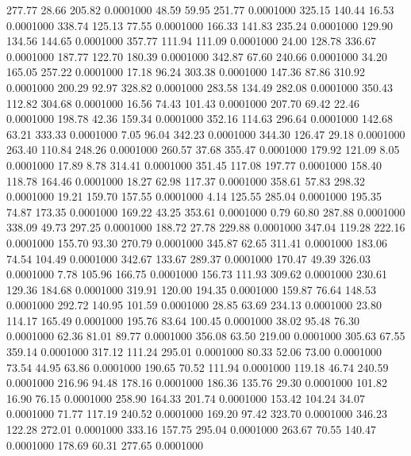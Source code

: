  277.77   28.66  205.82   0.0001000
  48.59   59.95  251.77   0.0001000
 325.15  140.44   16.53   0.0001000
 338.74  125.13   77.55   0.0001000
 166.33  141.83  235.24   0.0001000
 129.90  134.56  144.65   0.0001000
 357.77  111.94  111.09   0.0001000
  24.00  128.78  336.67   0.0001000
 187.77  122.70  180.39   0.0001000
 342.87   67.60  240.66   0.0001000
  34.20  165.05  257.22   0.0001000
  17.18   96.24  303.38   0.0001000
 147.36   87.86  310.92   0.0001000
 200.29   92.97  328.82   0.0001000
 283.58  134.49  282.08   0.0001000
 350.43  112.82  304.68   0.0001000
  16.56   74.43  101.43   0.0001000
 207.70   69.42   22.46   0.0001000
 198.78   42.36  159.34   0.0001000
 352.16  114.63  296.64   0.0001000
 142.68   63.21  333.33   0.0001000
   7.05   96.04  342.23   0.0001000
 344.30  126.47   29.18   0.0001000
 263.40  110.84  248.26   0.0001000
 260.57   37.68  355.47   0.0001000
 179.92  121.09    8.05   0.0001000
  17.89    8.78  314.41   0.0001000
 351.45  117.08  197.77   0.0001000
 158.40  118.78  164.46   0.0001000
  18.27   62.98  117.37   0.0001000
 358.61   57.83  298.32   0.0001000
  19.21  159.70  157.55   0.0001000
   4.14  125.55  285.04   0.0001000
 195.35   74.87  173.35   0.0001000
 169.22   43.25  353.61   0.0001000
   0.79   60.80  287.88   0.0001000
 338.09   49.73  297.25   0.0001000
 188.72   27.78  229.88   0.0001000
 347.04  119.28  222.16   0.0001000
 155.70   93.30  270.79   0.0001000
 345.87   62.65  311.41   0.0001000
 183.06   74.54  104.49   0.0001000
 342.67  133.67  289.37   0.0001000
 170.47   49.39  326.03   0.0001000
   7.78  105.96  166.75   0.0001000
 156.73  111.93  309.62   0.0001000
 230.61  129.36  184.68   0.0001000
 319.91  120.00  194.35   0.0001000
 159.87   76.64  148.53   0.0001000
 292.72  140.95  101.59   0.0001000
  28.85   63.69  234.13   0.0001000
  23.80  114.17  165.49   0.0001000
 195.76   83.64  100.45   0.0001000
  38.02   95.48   76.30   0.0001000
  62.36   81.01   89.77   0.0001000
 356.08   63.50  219.00   0.0001000
 305.63   67.55  359.14   0.0001000
 317.12  111.24  295.01   0.0001000
  80.33   52.06   73.00   0.0001000
  73.54   44.95   63.86   0.0001000
 190.65   70.52  111.94   0.0001000
 119.18   46.74  240.59   0.0001000
 216.96   94.48  178.16   0.0001000
 186.36  135.76   29.30   0.0001000
 101.82   16.90   76.15   0.0001000
 258.90  164.33  201.74   0.0001000
 153.42  104.24   34.07   0.0001000
  71.77  117.19  240.52   0.0001000
 169.20   97.42  323.70   0.0001000
 346.23  122.28  272.01   0.0001000
 333.16  157.75  295.04   0.0001000
 263.67   70.55  140.47   0.0001000
 178.69   60.31  277.65   0.0001000
